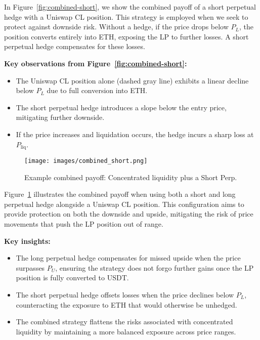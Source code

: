\documentclass[12pt]{article}
\begin{document}
In Figure~\ref{fig:combined-short}, we show the combined payoff of a short perpetual hedge with a Uniswap CL position. This strategy is employed when we seek to protect against downside risk. Without a hedge, if the price drops below $P_L$, the position converts entirely into ETH, exposing the LP to further losses. A short perpetual hedge compensates for these losses.

\medskip

\textbf{Key observations from Figure~\ref{fig:combined-short}:}
\begin{itemize}
    \item The Uniswap CL position alone (dashed gray line) exhibits a linear decline below $P_L$ due to full conversion into ETH.
    \item The short perpetual hedge introduces a slope below the entry price, mitigating further downside.
    \item If the price increases and liquidation occurs, the hedge incurs a sharp loss at $P_{\mathrm{liq}}$.
\end{itemize}

\medskip

\begin{figure}[htb]
    \centering
    \texttt{[image: images/combined\_short.png]}
    \caption{Example combined payoff: Concentrated liquidity plus a Short Perp.}
    \label{fig:combined-both}
\end{figure}

Figure~\ref{fig:combined-both} illustrates the combined payoff when using both a short and long perpetual hedge alongside a Uniswap CL position. This configuration aims to provide protection on both the downside and upside, mitigating the risk of price movements that push the LP position out of range.

\medskip

\textbf{Key insights:}
\begin{itemize}
    \item The long perpetual hedge compensates for missed upside when the price surpasses $P_U$, ensuring the strategy does not forgo further gains once the LP position is fully converted to USDT.
    \item The short perpetual hedge offsets losses when the price declines below $P_L$, counteracting the exposure to ETH that would otherwise be unhedged.
    \item The combined strategy flattens the risks associated with concentrated liquidity by maintaining a more balanced exposure across price ranges.
\end{itemize}
\end{document}
